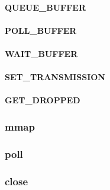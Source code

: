 \documentclass[12pt]{article}
\begin{document}
\paragraph{QUEUE\_BUFFER}

\paragraph{POLL\_BUFFER}

\paragraph{WAIT\_BUFFER}

\paragraph{SET\_TRANSMISSION}

\paragraph{GET\_DROPPED}

\subsubsection{mmap}

\subsubsection{poll}

\subsubsection{close}

\end{document}
